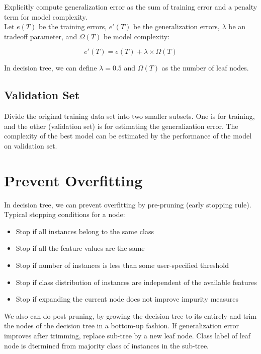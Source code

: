 \begin{multicols*}{2}
\noindent Explicitly compute generalization error as the sum of training error and a penalty term for model complexity. \\

\noindent Let $e(T)$ be the training errors, $e'(T)$ be the generalization errors, $\lambda$ be an tradeoff parameter, and $\Omega(T)$ be model complexity:

$$e'(T)=e(T) + \lambda \times \Omega(T)$$

\noindent In decision tree, we can define $\lambda=0.5$ and $\Omega(T)$ as the number of leaf nodes. 

\subsection{Validation Set}

Divide the original training data set into two smaller subsets. One is for training, and the other (validation set) is for estimating the generalization error. The complexity of the best model can be estimated by the performance of the model on validation set. 

\section{Prevent Overfitting}

\noindent In decision tree, we can prevent overfitting by pre-pruning (early stopping rule). Typical stopping conditions for a node:

\begin{itemize}
    \item Stop if all instances belong to the same class
    \item Stop if all the feature values are the same
    \item Stop if number of instances is less than some user-specified threshold
    \item Stop if class distribution of instances are independent of the available features
    \item Stop if expanding the current node does not improve impurity measures
\end{itemize}

\noindent We also can do post-pruning, by growing the decision tree to its entirely and trim the nodes of the decision tree in a bottom-up fashion. If generalization error improves after trimming, replace sub-tree by a new leaf node. Class label of leaf node is dtermined from majority class of instances in the sub-tree. 


\end{multicols*}
